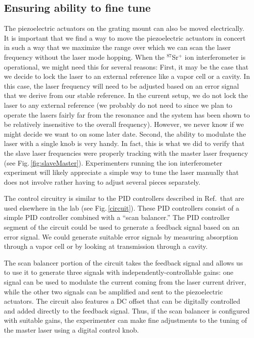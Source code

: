 \subsection{Ensuring ability to fine tune}
\label{ensuringAbilityToFineTune}

The piezoelectric actuators on the grating mount can also be moved electrically. It is important that we find a way to move the piezoelectric actuators in concert in such a way that we maximize the range over which we can scan the laser frequency without the laser mode hopping. When the $^{87}$Sr$^+$ ion interferometer is operational, we might need this for several reasons: First, it may be the case that we decide to lock the laser to an external reference like a vapor cell or a cavity. In this case, the laser frequency will need to be adjusted based on an error signal that we derive from our stable reference. In the current setup, we do not lock the laser to any external reference (we probably do not need to since we plan to operate the lasers fairly far from the resonance and the system has been shown to be relatively insensitive to the overall frequency). However, we never know if we might decide we want to on some later date. Second, the ability to modulate the laser with a single knob is very handy. In fact, this is what we did to verify that the slave laser frequencies were properly tracking with the master laser frequency (see Fig.\,\ref{fig:slaveMaster}). Experimenters running the ion interferometer experiment will likely appreciate a simple way to tune the laser manually that does not involve rather having to adjust several pieces separately. 


The control circuitry is similar to the PID controllers described in Ref.\,\cite{cjeDiss} that are used elsewhere in the lab (see Fig.\,\ref{circuit}). These PID controllers consist of a simple PID controller combined with a ``scan balancer.'' The PID controller segment of the circuit could be used to generate a feedback signal based on an error signal. We could generate suitable error signals by measuring absorption through a vapor cell or by looking at transmission through a cavity. 

The scan balancer portion of the circuit takes the feedback signal and allows us to use it to generate three signals with independently-controllable gains: one signal can be used to modulate the current coming from the laser current driver, while the other two signals can be amplified and sent to the piezoelectric actuators. The circuit also features a DC offset that can be digitally controlled and added directly to the feedback signal. Thus, if the scan balancer is configured with suitable gains, the experimenter can make fine adjustments to the tuning of the master laser using a digital control knob.

